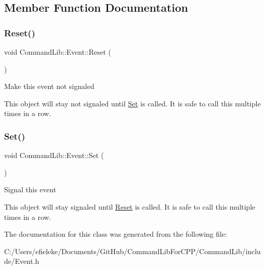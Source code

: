 \subsection{Member Function Documentation}
\mbox{\label{class_command_lib_1_1_event_a9674a73be80ce75b7438c1d03942bd9e}} 
\subsubsection{\texorpdfstring{Reset()}{Reset()}}
{\footnotesize\ttfamily void Command\+Lib\+::\+Event\+::\+Reset (\begin{DoxyParamCaption}{ }\end{DoxyParamCaption})}



Make this event not signaled

This object will stay not signaled until \mbox{\hyperlink{class_command_lib_1_1_event_a321cb0c97c92012908816b0ced0dcc84}{Set}} is called. It is safe to call this multiple times in a row. \mbox{\label{class_command_lib_1_1_event_a321cb0c97c92012908816b0ced0dcc84}} 
\subsubsection{\texorpdfstring{Set()}{Set()}}
{\footnotesize\ttfamily void Command\+Lib\+::\+Event\+::\+Set (\begin{DoxyParamCaption}{ }\end{DoxyParamCaption})}



Signal this event

This object will stay signaled until \mbox{\hyperlink{class_command_lib_1_1_event_a9674a73be80ce75b7438c1d03942bd9e}{Reset}} is called. It is safe to call this multiple times in a row. 

The documentation for this class was generated from the following file\+:\begin{DoxyCompactItemize}
\item 
C\+:/\+Users/efieleke/\+Documents/\+Git\+Hub/\+Command\+Lib\+For\+C\+P\+P/\+Command\+Lib/include/Event.\+h\end{DoxyCompactItemize}
